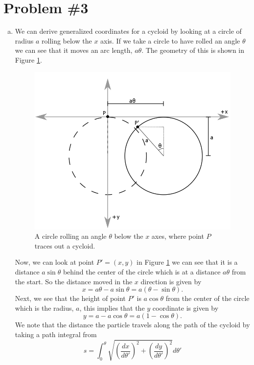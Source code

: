 \documentclass[11pt]{article}
\numberwithin{equation}{section}
\begin{document}
\pagebreak

\section{Problem \#3}
\begin{enumerate}[(a)]
\item We can derive generalized coordinates for a cycloid by looking at a circle of radius 
$a$ rolling below the $x$ axis. If we take a circle to have rolled an angle $\theta$ we can 
see that it moves an arc length, $a\theta$. The geometry of this is shown in Figure 
\ref{Figure}.
\begin{figure}
\centering
\includegraphics[width=1.0\textwidth]{Figure.png}
\caption{A circle rolling an angle $\theta$ below the $x$ axes, where point $P$ traces out 
a cycloid.}
\label{Figure}
\end{figure}
Now, we can look at point $P' = (x,y)$ in Figure \ref{Figure} we can see that it is a distance 
$a\sin\theta$ behind the center of the circle which is at a distance $a\theta$ from the 
start. So the distance moved in the $x$ direction is given by
$$x = a\theta - a\sin\theta = a(\theta-\sin\theta).$$
Next, we see that the height of point $P'$ is $a\cos\theta$ from the center of the circle
which is the radius, $a$, this implies that the $y$ coordinate is given by
$$y = a - a\cos\theta = a(1-\cos\theta).$$
We note that the distance the particle travels along the path of the cycloid by taking a 
path integral from 
$$s = \int_{0}^{\theta}\sqrt{\left(\frac{dx}{d\theta'}\right)^2 + \left(\frac{dy}{d\theta'}\right)^2}d\theta'$$

\end{enumerate}
\end{document}
